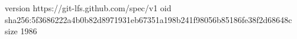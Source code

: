 version https://git-lfs.github.com/spec/v1
oid sha256:5f3686222a4b0b82d8971931eb67351a198b241f98056b85186fe38f2d68648c
size 1986
